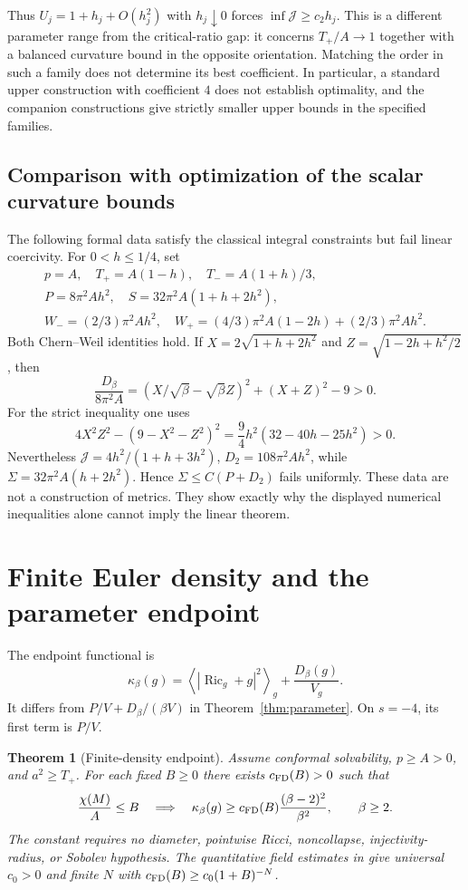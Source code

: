 \documentclass[11pt,a4paper]{article}
\newtheorem{theorem}{Theorem}[section]
\theoremstyle{definition}
\theoremstyle{remark}
\newcommand{\Ric}{\operatorname{Ric}}
\newcommand{\J}{\mathcal J}
\newcommand{\av}[1]{\left\langle#1\right\rangle}
\begin{document}
Thus $U_j=1+h_j+O(h_j^2)$ with $h_j\downarrow0$ forces $\inf\J\ge c_2h_j$. This is a different parameter range from the critical-ratio gap: it concerns $T_+/A\to1$ together with a balanced curvature bound in the opposite orientation. Matching the order in such a family does not determine its best coefficient. In particular, a standard upper construction with coefficient $4$ does not establish optimality, and the companion constructions give strictly smaller upper bounds in the specified families.

\subsection{Comparison with optimization of the scalar curvature bounds}
The following formal data satisfy the classical integral constraints but fail linear coercivity. For $0<h\le1/4$, set
\begin{gather*}
 p=A,\quad T_+=A(1-h),\quad T_-=A(1+h)/3,\\
 P=8\pi^2Ah^2,\quad S=32\pi^2A(1+h+2h^2),\\
 W_-=(2/3)\pi^2Ah^2,\quad
 W_+=(4/3)\pi^2A(1-2h)+(2/3)\pi^2Ah^2.
\end{gather*}
Both Chern--Weil identities hold. If $X=2\sqrt{1+h+2h^2}$ and $Z=\sqrt{1-2h+h^2/2}$, then
\[
 \frac{D_\beta}{8\pi^2A}
 =\left(X/\sqrt\beta-\sqrt\beta Z\right)^2+(X+Z)^2-9>0.
\]
For the strict inequality one uses
\[
 4X^2Z^2-(9-X^2-Z^2)^2
 =\frac94h^2(32-40h-25h^2)>0.
\]
Nevertheless $\J=4h^2/(1+h+3h^2)$, $D_2=108\pi^2Ah^2$, while $\Sigma=32\pi^2A(h+2h^2)$. Hence $\Sigma\le C(P+D_2)$ fails uniformly. These data are not a construction of metrics. They show exactly why the displayed numerical inequalities alone cannot imply the linear theorem.

\section{Finite Euler density and the parameter endpoint}
The endpoint functional is
\begin{equation}
 \kappa_\beta(g)=\av{|\Ric_g+g|^2}_g+\frac{D_\beta(g)}{V_g}.
 \label{eq:kappa}
\end{equation}
It differs from $P/V+D_\beta/(\beta V)$ in Theorem~\ref{thm:parameter}. On $s=-4$, its first term is $P/V$.

\begin{theorem}[Finite-density endpoint]\label{thm:FD}
Assume conformal solvability, $p\ge A>0$, and $a^2\ge T_+$. For each fixed $B\ge0$ there exists $c_{\rm FD}(B)>0$ such that
\begin{equation}
 \frac{\chi(M)}A\le B
 \quad\Longrightarrow\quad
 \kappa_\beta(g)\ge c_{\rm FD}(B)\frac{(\beta-2)^2}{\beta^2},
 \qquad \beta\ge2.
 \label{eq:FD}
\end{equation}
The constant requires no diameter, pointwise Ricci, noncollapse, injectivity-radius, or Sobolev hypothesis. The quantitative field estimates in \cite{FDrates} give universal $c_0>0$ and finite $N$ with $c_{\rm FD}(B)\ge c_0(1+B)^{-N}$.
\end{theorem}
\end{document}
